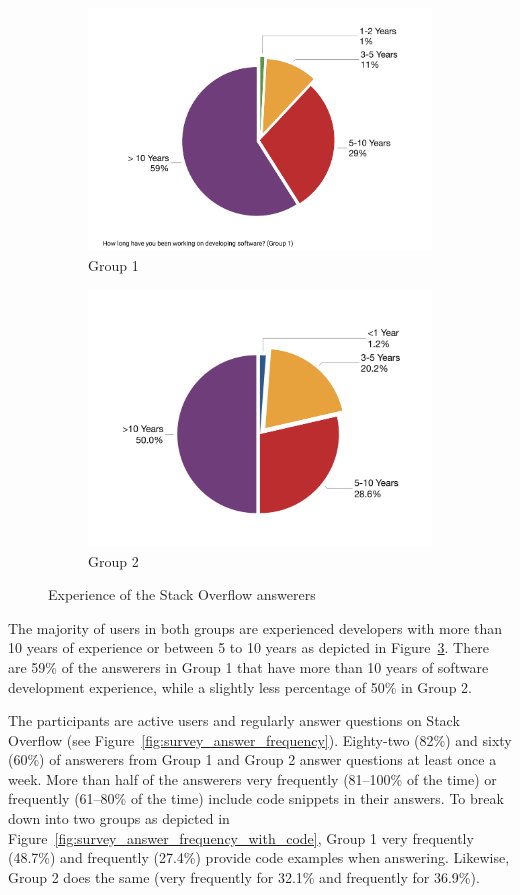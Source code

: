 \documentclass{svjour3}                     %
\begin{document}
\begin{figure}
	\begin{subfigure}{.5\textwidth}
		\centering
		\includegraphics[width=0.8\linewidth]{survey_exp_1}
		\caption{Group 1}
		\label{fig:survey_group1_exp}
	\end{subfigure}%
	\begin{subfigure}{.5\textwidth}
		\centering
		\includegraphics[width=0.8\linewidth]{survey_exp_2}
		\caption{Group 2}
		\label{fig:survey_group2_exp}
	\end{subfigure}
	\caption{Experience of the Stack Overflow answerers}
	\label{fig:survey_exp}
\end{figure}

The majority of users in both groups are experienced developers with more than
10 years of experience or between 5 to 10 years as depicted in
Figure~\ref{fig:survey_exp}. There are 59\% of the answerers in Group 1 that
have more than 10 years of software development experience, while a slightly less
percentage of 50\% in Group 2.

The participants are active users and regularly answer questions on Stack
Overflow (see Figure~\ref{fig:survey_answer_frequency}). Eighty-two (82\%) and
sixty (60\%) of answerers from Group 1 and Group 2  answer questions at
least once a week.
More than half of the answerers very frequently (81--100\% of the time) or
frequently (61--80\% of the time) include code snippets in their answers. To
break down into two groups as depicted in
Figure~\ref{fig:survey_answer_frequency_with_code}, Group 1 very frequently
(48.7\%) and frequently (27.4\%) provide code examples when answering. Likewise,
Group 2 does the same (very frequently for 32.1\% and frequently for 36.9\%).
\end{document}
